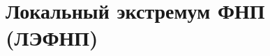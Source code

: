 \documentclass[../main.tex]{subfiles}
\begin{document}
 \chapter{Локальный экстремум ФНП (ЛЭФНП)}
 
\end{document}
